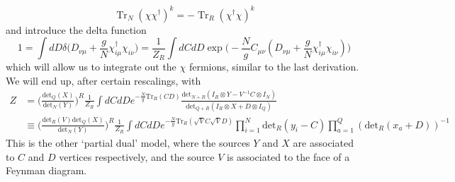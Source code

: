 \documentclass[english]{article}
\DeclareMathOperator{\Tr}{Tr}
\newcommand\be{\begin{equation}}
\newcommand\ee{\end{equation}}
\newcommand{\inv}{\frac{1}}
\renewcommand{\>}{\rangle}
\newcommand{\<}{\langle}
\newcommand{\de}{\delta}
\newcommand{\dg}{\dagger}
\renewcommand{\(}{\left(}
\renewcommand{\)}{\right)}
\newcommand{\chid}{\chi^{\dg}}
\begin{document}
\be 
\Tr_N(\chi\chid)^k = - \Tr_R(\chid\chi)^k
\ee 
and introduce the delta function
\be 
1 = \int dD \de\bigg( D_{\nu\mu} + \frac{g}{N}\chid_{i\mu}\chi_{i\nu} \bigg) = \inv{Z_R} \int dC dD \exp\bigg(-\frac{N}{g} C_{\mu\nu}(D_{\nu\mu} + \frac{g}{N}\chid_{i\mu}\chi_{i\nu}) \bigg)
\ee 
which will allow us to integrate out the $\chi$ fermions, similar to the last derivation. We will end up, after certain rescalings, with 
\be 
\begin{split}
    Z&= \bigg(\frac{\text{det}_Q(X)}{\text{det}_N(Y)}\bigg)^R\frac{1}{Z_R} \int dCdD e^{-\frac{N}{g}\text{Tr}_R(CD)}\frac{\text{det}_{N+R}(I_R\otimes Y-V^{-1}C\otimes I_N )}{\text{det}_{Q+R}(I_R\otimes X + D\otimes I_Q)}\\
    &\equiv \bigg(\frac{\text{det}_R(V)\text{det}_Q(X)}{\text{det}_N(Y)}\bigg)^R\frac{1}{Z_R} \int d{C}dD e^{-\frac{N}{g}\text{Tr}_R(\sqrt{V}{C}\sqrt{V}D)}\prod_{i=1}^N \text{det}_R(y_i - { C}) \prod_{a=1}^{Q} (\text{det}_R(x_a + D))^{-1}
\end{split}
\ee 
This is the other `partial dual' model, where the sources $Y$ and $X$ are associated to $ C$ and $D$ vertices respectively, and the source $V$ is associated to the face of a Feynman diagram. 

















\end{document}
